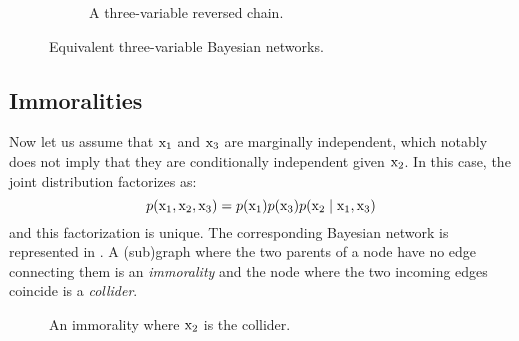 \begin{figure}
\begin{subfigure}[t]{0.32\textwidth}
{}
        \caption{A three-variable reversed chain.}
        \label{fig:revchain_bayesian_net}
    \end{subfigure}
    \caption{Equivalent three-variable Bayesian networks.}
    \label{fig:equiv_bayesian_nets}
\end{figure}

\subsection{Immoralities}
\label{sec:immoralities}
Now let us assume that ${\textnormal{x}}_1$ and ${\textnormal{x}}_3$ are marginally independent, which notably does not imply that they are conditionally independent given ${\textnormal{x}}_2$. In this case, the joint distribution factorizes as:
\begin{equation}
    p({\textnormal{x}}_1, {\textnormal{x}}_2, {\textnormal{x}}_3) = p({\textnormal{x}}_1) p({\textnormal{x}}_3) p({\textnormal{x}}_2 \mid {\textnormal{x}}_1, {\textnormal{x}}_3)
\end{equation}
and this factorization is unique. The corresponding Bayesian network is represented in . A (sub)graph where the two parents of a node have no edge connecting them is  an \emph{immorality} and the node where the two incoming edges coincide is a \emph{collider}.

\begin{figure}
    \centering
    \caption{An immorality where ${\textnormal{x}}_2$ is the collider.}
    \label{fig:immorality_bayesian_net}
\end{figure}

